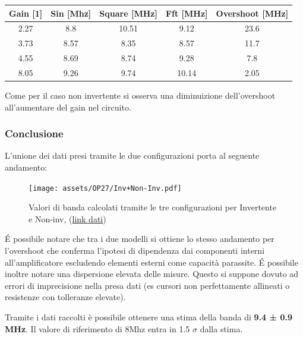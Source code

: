 \begin{table}[!h]
    \centering
    \begin{tabular}{|c|c|c|c|c|}
    \hline
    \textbf{Gain {[}1{]}} & \textbf{Sin {[}Mhz{]}} & \textbf{Square {[}MHz{]}} & \textbf{Fft {[}MHz{]}} & \textbf{Overshoot {[}MHz{]}} \\ \hline
    2.27                  & 8.8                    & 10.51                     & 9.12                   & 23.6                         \\ \hline
    3.73                  & 8.57                   & 8.35                      & 8.57                   & 11.7                         \\ \hline
    4.55                  & 8.69                   & 8.74                      & 9.28                   & 7.8                          \\ \hline
    8.05                  & 9.26                   & 9.74                      & 10.14                  & 2.05                         \\ \hline
    \end{tabular}
\end{table}


Come per il caso non invertente si osserva una diminuizione dell'overshoot all'aumentare del gain nel circuito. 

\subsubsection{Conclusione}

L'unione dei dati presi tramite le due configurazioni porta al seguente andamento:

\begin{figure}[!h]
    \centering
    \texttt{[image: assets/OP27/Inv+Non-Inv.pdf]}
    \caption{Valori di banda calcolati tramite le tre configurazioni per Invertente e Non-inv, (\href{https://github.com/Yedi278/Esperimentazioni-Elettronica/tree/main/-\%20OPAMP/OP27}{link dati})
    }
\end{figure}

\'E possibile notare che tra i due modelli si ottiene lo stesso andamento per l'overshoot che conferma l'ipotesi di dipendenza dai componenti interni all'amplificatore escludendo elementi esterni come capacità parassite.
\'E possibile inoltre notare una dispersione elevata delle misure. Questo si suppone dovuto ad errori di imprecisione nella presa dati (es cursori non perfettamente allineati o resistenze con tolleranze elevate).

Tramite i dati raccolti è possibile ottenere una stima della banda di \textbf{9.4 ± 0.9 MHz}. Il valore di riferimento di 8Mhz entra in 1.5 $\sigma$ dalla stima.

